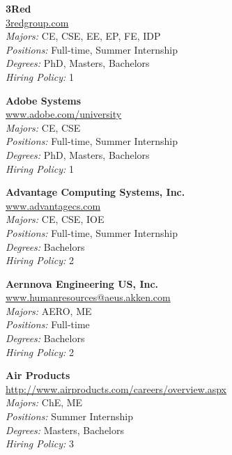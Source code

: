 \documentclass[twoside]{article}
\begin{document}
\begin{center}\begin{multicols}{3}
\begin{minipage}{.9\columnwidth}{\Large\bf 3Red }\\
	\url{3redgroup.com}\\
	\emph{Majors:} CE, CSE, EE, EP, FE, IDP\\
	\emph{Positions:} Full-time, Summer Internship\\
	\emph{Degrees:} PhD, Masters, Bachelors\\
	\emph{Hiring Policy:} 1\\
\end{minipage}
 
\begin{minipage}{.9\columnwidth}{\Large\bf Adobe Systems }\\
	\url{www.adobe.com/university}\\
	\emph{Majors:} CE, CSE\\
	\emph{Positions:} Full-time, Summer Internship\\
	\emph{Degrees:} PhD, Masters, Bachelors\\
	\emph{Hiring Policy:} 1\\
\end{minipage}
 
\begin{minipage}{.9\columnwidth}{\Large\bf Advantage Computing Systems, Inc. }\\
	\url{www.advantagecs.com}\\
	\emph{Majors:} CE, CSE, IOE\\
	\emph{Positions:} Full-time, Summer Internship\\
	\emph{Degrees:} Bachelors\\
	\emph{Hiring Policy:} 2\\
\end{minipage}
 
\begin{minipage}{.9\columnwidth}{\Large\bf Aernnova Engineering US, Inc. }\\
	\url{www.humanresources@aeus.akken.com}\\
	\emph{Majors:} AERO, ME\\
	\emph{Positions:} Full-time\\
	\emph{Degrees:} Bachelors\\
	\emph{Hiring Policy:} 2\\
\end{minipage}
 
\begin{minipage}{.9\columnwidth}{\Large\bf Air Products }\\
	\url{http://www.airproducts.com/careers/overview.aspx}\\
	\emph{Majors:} ChE, ME\\
	\emph{Positions:} Summer Internship\\
	\emph{Degrees:} Masters, Bachelors\\
	\emph{Hiring Policy:} 3\\
\end{minipage}
 

\end{multicols}
\end{center}
\end{document}
